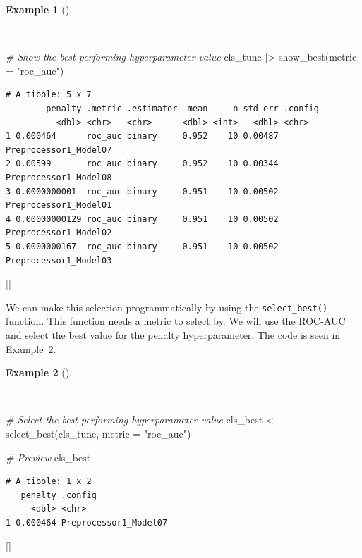 \documentclass[
  letterpaper,
  krantz1]{latex/krantz-mod}
\newenvironment{Shaded}{\begin{snugshade}}{\end{snugshade}}
\newcommand{\AttributeTok}[1]{\textcolor[rgb]{0.00,0.00,0.00}{#1}}
\newcommand{\CommentTok}[1]{\textcolor[rgb]{0.00,0.00,0.00}{\textit{#1}}}
\newcommand{\FunctionTok}[1]{\textcolor[rgb]{0.00,0.00,0.00}{#1}}
\newcommand{\NormalTok}[1]{\textcolor[rgb]{0.00,0.00,0.00}{#1}}
\newcommand{\OtherTok}[1]{\textcolor[rgb]{0.00,0.00,0.00}{#1}}
\newcommand{\SpecialCharTok}[1]{\textcolor[rgb]{0.00,0.00,0.00}{#1}}
\newcommand{\StringTok}[1]{\textcolor[rgb]{0.00,0.00,0.00}{#1}}
\newcommand{\cindex}[1]{%
  \StrSubstitute{#1}{_}{\_}[\temp]%
  \index{\temp}%
}
\theoremstyle{definition}
\theoremstyle{definition}
\newtheorem{example}{Example}[chapter]
\theoremstyle{remark}
\begin{document}
\begin{example}[]\protect\hypertarget{exm-predict-class-model-spec-tune-grid-collect-best}{}\label{exm-predict-class-model-spec-tune-grid-collect-best}

~

\begin{Shaded}
\begin{Highlighting}[numbers=left,,]
\CommentTok{\# Show the best performing hyperparameter value}
\NormalTok{cls\_tune }\SpecialCharTok{|\textgreater{}}
  \FunctionTok{show\_best}\NormalTok{(}\AttributeTok{metric =} \StringTok{"roc\_auc"}\NormalTok{)}
\end{Highlighting}
\end{Shaded}

\begin{verbatim}
# A tibble: 5 x 7
        penalty .metric .estimator  mean     n std_err .config              
          <dbl> <chr>   <chr>      <dbl> <int>   <dbl> <chr>                
1 0.000464      roc_auc binary     0.952    10 0.00487 Preprocessor1_Model07
2 0.00599       roc_auc binary     0.952    10 0.00344 Preprocessor1_Model08
3 0.0000000001  roc_auc binary     0.951    10 0.00502 Preprocessor1_Model01
4 0.00000000129 roc_auc binary     0.951    10 0.00502 Preprocessor1_Model02
5 0.0000000167  roc_auc binary     0.951    10 0.00502 Preprocessor1_Model03
\end{verbatim}

 \cindex{show_best()}

\end{example}

We can make this selection programmatically by using the
\texttt{select\_best()} function. This function needs a metric to select
by. We will use the ROC-AUC and select the best value for the penalty
hyperparameter. The code is seen in
Example~\ref{exm-predict-class-model-spec-tune-grid-collect-select}.

\pagebreak

\begin{example}[]\protect\hypertarget{exm-predict-class-model-spec-tune-grid-collect-select}{}\label{exm-predict-class-model-spec-tune-grid-collect-select}

~

\begin{Shaded}
\begin{Highlighting}[numbers=left,,]
\CommentTok{\# Select the best performing hyperparameter value}
\NormalTok{cls\_best }\OtherTok{\textless{}{-}}
  \FunctionTok{select\_best}\NormalTok{(cls\_tune, }\AttributeTok{metric =} \StringTok{"roc\_auc"}\NormalTok{)}

\CommentTok{\# Preview}
\NormalTok{cls\_best}
\end{Highlighting}
\end{Shaded}

\begin{verbatim}
# A tibble: 1 x 2
   penalty .config              
     <dbl> <chr>                
1 0.000464 Preprocessor1_Model07
\end{verbatim}

 \cindex{select_best()}

\end{example}
\end{document}
